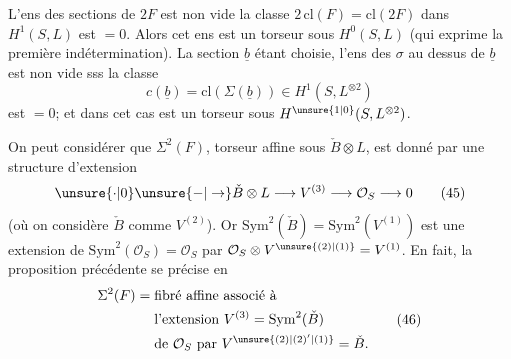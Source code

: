 L'ens des sections de $2F$ est   
 non vide  la classe $2\,\mathrm{cl}(F)=\mathrm{cl}(2F)$
dans $H^1(S,L)$ est $=0$. Alors cet ens est
un torseur sous $H^0(S,L)$ (qui exprime
la première indétermination). La section
$\underline b$ étant choisie, l'ens des $\sigma$ au dessus
de $\underline b$ est non vide sss la classe
\[
 c(\underline b)=\mathrm{cl}(\Sigma(\underline b))\in H^1(S,L^{\otimes2})
\]
est $=0$; et dans cet cas est un torseur
sous $H^{\unsure{1|0}}(S,L^{\otimes2})$.

On peut considérer que $\Sigma^2(F)$, torseur
affine sous $\check B\otimes L$, est donné par une
structure d'extension
\[
 \unsure{\cdot|0}\unsure{-|\to}\check B\otimes L\longrightarrow V^{(3)}\longrightarrow\mathcal O_S\longrightarrow0 \tag*{(45)}
\]
(où on considère $\check B$ comme $V^{(2)}$).
Or $\mathrm{Sym}^2(\check B)=\mathrm{Sym}^2(V^{(1)})$ est une
extension de $\mathrm{Sym}^2(\mathcal O_S)=\mathcal O_S$ par $\mathcal O_S\otimes V^{\unsure{(2)|(1)}}=V^{(1)}$.
En fait, la proposition précédente se
précise en
\[
\begin{aligned}
 \Sigma^2(F)={}&\text{fibré affine associé à}\\
 &\text{l'extension }V^{(3)}=\mathrm{Sym}^2(\check B)\\
 &\text{de }\mathcal O_S\text{ par }V^{\unsure{(2)|(2)'|(1)}}=\check B.
\end{aligned}
\tag*{(46)}
\]
